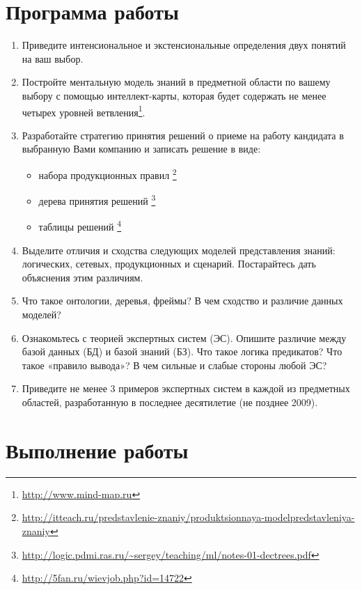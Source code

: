 





\tableofcontents
\newpage

\section{Программа работы}

\begin{enumerate}
	\item Приведите интенсиональное и экстенсиональные определения двух понятий на ваш выбор.
	\item Постройте ментальную модель знаний в предметной области по вашему выбору с помощью интеллект-карты, которая будет содержать не менее четырех уровней ветвления\footnote{\url{http://www.mind-map.ru}}.
	\item Разработайте стратегию принятия решений о приеме на работу кандидата в выбранную Вами компанию и записать решение в виде:
	\begin{itemize}
		\item набора продукционных правил \footnote{\url{http://itteach.ru/predstavlenie-znaniy/produktsionnaya-modelpredstavleniya-znaniy}}
		\item дерева принятия решений  \footnote{\url{http://logic.pdmi.ras.ru/~sergey/teaching/ml/notes-01-dectrees.pdf}}
		\item таблицы решений \footnote{\url{http://5fan.ru/wievjob.php?id=14722}}
	\end{itemize}
	\item Выделите отличия и сходства следующих моделей представления знаний: логических, сетевых, продукционных и сценарий. Постарайтесь дать объяснения этим различиям.
	\item Что такое онтологии, деревья, фреймы? В чем сходство и различие данных моделей?
	\item Ознакомьтесь с теорией экспертных систем (ЭС). Опишите различие между базой данных (БД) и базой знаний (БЗ). Что такое логика предикатов? Что такое «правило вывода»? В чем сильные и слабые стороны любой ЭС?
	\item Приведите не менее 3 примеров экспертных систем в каждой из предметных областей, разработанную в последнее десятилетие (не позднее 2009).
\end{enumerate}

\newpage

\section{Выполнение работы}

